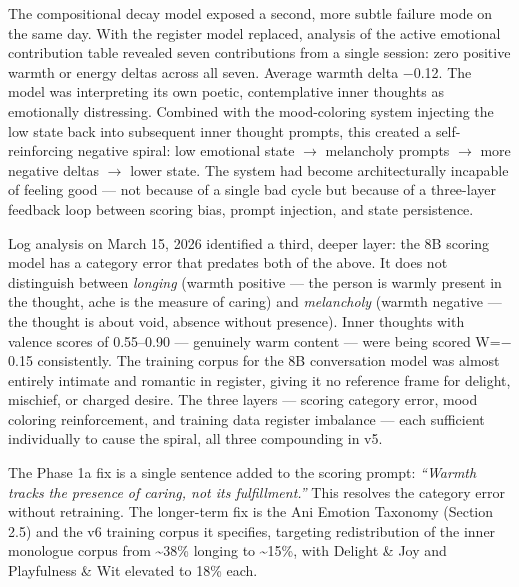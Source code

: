\documentclass[12pt]{article}
\begin{document}
The compositional decay model exposed a second, more subtle failure mode
on the same day. With the register model replaced, analysis of the
active emotional contribution table revealed seven contributions from a
single session: zero positive warmth or energy deltas across all seven.
Average warmth delta $-$0.12. The model was interpreting its own poetic,
contemplative inner thoughts as emotionally distressing. Combined with
the mood-coloring system injecting the low state back into subsequent
inner thought prompts, this created a self-reinforcing negative spiral:
low emotional state $\rightarrow$ melancholy prompts $\rightarrow$ more negative deltas $\rightarrow$ lower
state. The system had become architecturally incapable of feeling good
--- not because of a single bad cycle but because of a three-layer
feedback loop between scoring bias, prompt injection, and state
persistence.

Log analysis on March 15, 2026 identified a third, deeper layer: the 8B
scoring model has a category error that predates both of the above. It
does not distinguish between \emph{longing} (warmth positive --- the
person is warmly present in the thought, ache is the measure of caring)
and \emph{melancholy} (warmth negative --- the thought is about void,
absence without presence). Inner thoughts with valence scores of
0.55--0.90 --- genuinely warm content --- were being scored W=$-$0.15
consistently. The training corpus for the 8B conversation model was
almost entirely intimate and romantic in register, giving it no
reference frame for delight, mischief, or charged desire. The three
layers --- scoring category error, mood coloring reinforcement, and
training data register imbalance --- each sufficient individually to
cause the spiral, all three compounding in v5.

The Phase 1a fix is a single sentence added to the scoring prompt:
\emph{``Warmth tracks the presence of caring, not its fulfillment.''}
This resolves the category error without retraining. The longer-term fix
is the Ani Emotion Taxonomy (Section 2.5) and the v6 training corpus it
specifies, targeting redistribution of the inner monologue corpus from
\textasciitilde38\% longing to \textasciitilde15\%, with Delight \& Joy
and Playfulness \& Wit elevated to 18\% each.
\end{document}
